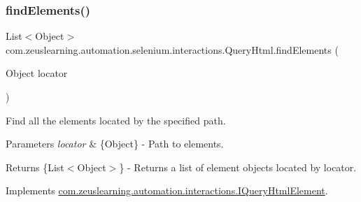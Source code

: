 \subsubsection{\texorpdfstring{find\+Elements()}{findElements()}}
{\footnotesize\ttfamily List$<$Object$>$ com.\+zeuslearning.\+automation.\+selenium.\+interactions.\+Query\+Html.\+find\+Elements (\begin{DoxyParamCaption}\item[{Object}]{locator }\end{DoxyParamCaption})\hspace{0.3cm}{\ttfamily [inline]}}

Find all the elements located by the specified path.


\begin{DoxyParams}{Parameters}
{\em locator} & \{Object\} -\/ Path to elements. \\
\hline
\end{DoxyParams}
\begin{DoxyReturn}{Returns}
\{List$<$\+Object$>$\} -\/ Returns a list of element objects located by {\ttfamily locator}. 
\end{DoxyReturn}


Implements \hyperlink{interfacecom_1_1zeuslearning_1_1automation_1_1interactions_1_1IQueryHtmlElement_a5c5990f50e669bc767e14aa9b8907b9b}{com.\+zeuslearning.\+automation.\+interactions.\+I\+Query\+Html\+Element}.

